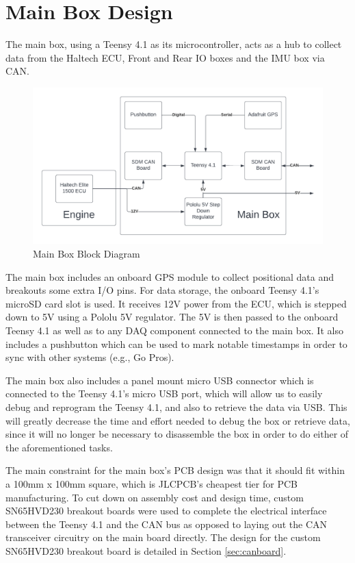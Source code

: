 \section{Main Box Design}
The main box, using a Teensy 4.1 as its microcontroller, acts as a hub to collect data from the Haltech ECU, Front and Rear IO boxes and the IMU box via CAN.
\begin{figure}[H]
    \centering
    \includegraphics[width=5.5in]{images/SDM-23 Main Box Block Diagram.png}
    \caption{Main Box Block Diagram}
    \label{fig:sdm23mainboxblock}
\end{figure}

The main box includes an onboard GPS module to collect positional data and breakouts some extra I/O pins.
For data storage, the onboard Teensy 4.1's microSD card slot is used.
It receives 12V power from the ECU, which is stepped down to 5V using a Pololu 5V regulator.
The 5V is then passed to the onboard Teensy 4.1 as well as to any DAQ component connected to the main box.
It also includes a pushbutton which can be used to mark notable timestamps in order to sync with other systems (e.g., Go Pros).
\vspace{1em}

The main box also includes a panel mount micro USB connector which is connected to the Teensy 4.1's micro USB port, which will allow us to easily debug and reprogram the Teensy 4.1, and also to retrieve the data via USB.
This will greatly decrease the time and effort needed to debug the box or retrieve data, since it will no longer be necessary to disassemble the box in order to do either of the aforementioned tasks.
\vspace{1em}

The main constraint for the main box's PCB design was that it should fit within a 100mm x 100mm square, which is JLCPCB's cheapest tier for PCB manufacturing.
To cut down on assembly cost and design time, custom SN65HVD230 breakout boards were used to complete the electrical interface between the Teensy 4.1 and the CAN bus as opposed to laying out the CAN transceiver circuitry on the main board directly.
The design for the custom SN65HVD230 breakout board is detailed in Section \ref{sec:canboard}.
\vspace{1em}


